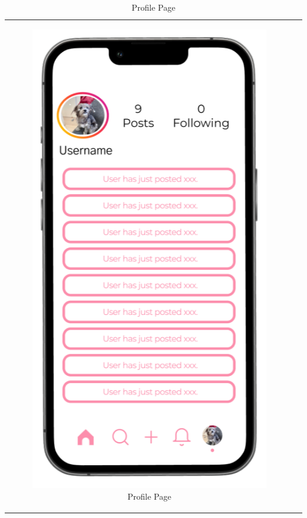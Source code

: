 \begin{longtable}{@{}cc@{}}
\begin{subfigure}{.5\textwidth}
        \includegraphics[width=.8\linewidth]{Figures/profile.png}
        \caption{\footnotesize Profile Page}
        \label{fig:profile}
    \end{subfigure} \\
\end{longtable}